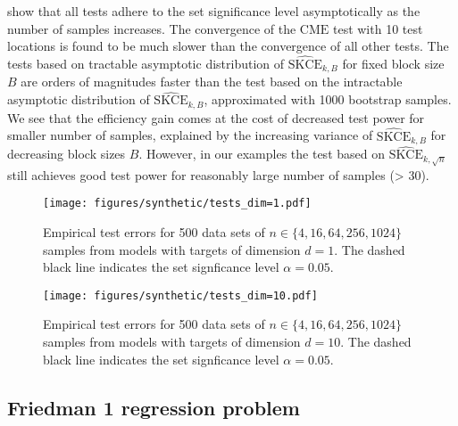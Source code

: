 \documentclass{article}
\begin{document}
 show that all tests adhere to the set
significance level asymptotically as the number of samples increases. The convergence of
the $\mathrm{CME}$ test with 10 test locations is found to be much slower than the convergence
of all other tests.
The tests based on tractable asymptotic distribution of $\widehat{\mathrm{SKCE}}_{k,B}$ for
fixed block size $B$ are orders of magnitudes faster than the test based on the intractable
asymptotic distribution of $\widehat{\mathrm{SKCE}}_{k,B}$, approximated with 1000 bootstrap
samples. We see that the efficiency gain comes at the cost of decreased test power for smaller
number of samples, explained by the increasing variance of $\widehat{\mathrm{SKCE}}_{k,B}$ for
decreasing block sizes $B$.
However, in our examples the test based on $\widehat{\mathrm{SKCE}}_{k,\sqrt{n}}$
still achieves good test power for reasonably large number of samples (> 30).

\begin{figure}[hpt]
    \begin{center}
        \texttt{[image: figures/synthetic/tests\_dim=1.pdf]}
        \caption{Empirical test errors for 500 data sets of $n \in \{4, 16, 64, 256, 1024\}$
        samples from models with targets of dimension $d = 1$. The dashed black line
        indicates the set signficance level $\alpha = 0.05$.}
        \label{fig:synthetic_tests_1}
    \end{center}
\end{figure}

\begin{figure}[hpt]
    \begin{center}
        \texttt{[image: figures/synthetic/tests\_dim=10.pdf]}
        \caption{Empirical test errors for 500 data sets of $n \in \{4, 16, 64, 256, 1024\}$
        samples from models with targets of dimension $d = 10$. The dashed black line
        indicates the set signficance level $\alpha = 0.05$.}
        \label{fig:synthetic_tests_10}
    \end{center}
\end{figure}

\clearpage

\subsection{Friedman 1 regression problem}
\end{document}
